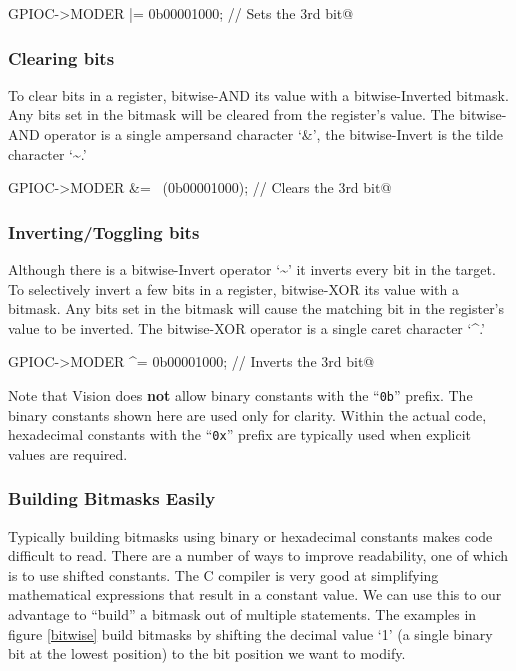 \documentclass[11pt,fleqn]{book} %
\makeatletter
\newcommand{\ilcode}[1]{
    \begin{center} \parskip=-15pt \colorbox{gray!20!white}{
        \parbox{\columnwidth-2\fboxsep}{
            \lstinline@#1@
        }
    } \end{center}
}
\makeatother
\begin{document}
\ilcode{GPIOC->MODER |= 0b00001000;    // Sets the 3rd bit}%

\subsubsection{Clearing bits}
To clear bits in a register, bitwise-AND its value with a bitwise-Inverted bitmask. Any bits set in the bitmask will be cleared from the register's value. The bitwise-AND operator is a single ampersand character `\&', the bitwise-Invert is the tilde character `\textasciitilde.'
\ilcode{GPIOC->MODER \&= ~(0b00001000);    // Clears the 3rd bit}%

\subsubsection{Inverting/Toggling bits}
Although there is a bitwise-Invert operator `\textasciitilde' it inverts every bit in the target. To selectively invert a few bits in a register, bitwise-XOR its value with a bitmask. Any bits set in the bitmask will cause the matching bit in the register's value to be inverted. The bitwise-XOR operator is a single caret character `\textasciicircum.'

\ilcode{GPIOC->MODER ^= 0b00001000;    // Inverts the 3rd bit}%

\begin{warning}
    Note that {\textmu}Vision does \textbf{not} allow binary constants with the ``\texttt{0b}'' prefix. The binary constants shown here are used only for clarity. Within the actual code, hexadecimal constants with the ``\texttt{0x}'' prefix are typically used when explicit values are required.  
\end{warning}

\subsubsection{Building Bitmasks Easily}

Typically building bitmasks using binary or hexadecimal constants makes code difficult to read. There are a number of ways to improve readability, one of which is to use shifted constants. The C compiler is very good at simplifying mathematical expressions that result in a constant value. We can use this to our advantage to ``build'' a bitmask out of multiple statements. The examples in figure \vref{bitwise} build bitmasks by shifting the decimal value `1' (a single binary bit at the lowest position) to the bit position we want to modify.
\end{document}
